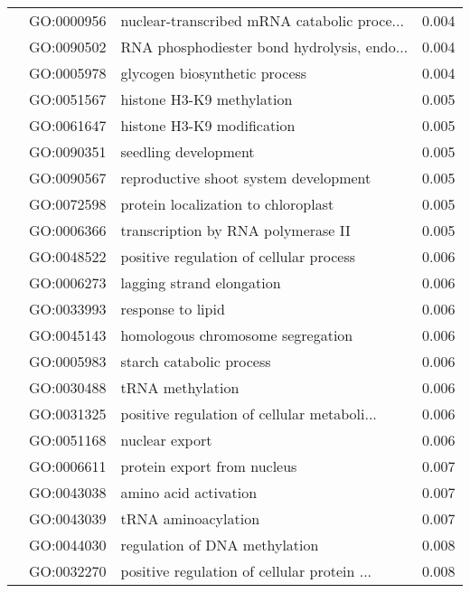 \begin{longtable}{lllr}
   & GO:0000956 &  nuclear-transcribed mRNA catabolic proce... &         0.004 \\
   & GO:0090502 &  RNA phosphodiester bond hydrolysis, endo... &         0.004 \\
   & GO:0005978 &                glycogen biosynthetic process &         0.004 \\
   & GO:0051567 &                    histone H3-K9 methylation &         0.005 \\
   & GO:0061647 &                   histone H3-K9 modification &         0.005 \\
   & GO:0090351 &                         seedling development &         0.005 \\
   & GO:0090567 &        reproductive shoot system development &         0.005 \\
   & GO:0072598 &          protein localization to chloroplast &         0.005 \\
   & GO:0006366 &           transcription by RNA polymerase II &         0.005 \\
   & GO:0048522 &      positive regulation of cellular process &         0.006 \\
   & GO:0006273 &                    lagging strand elongation &         0.006 \\
   & GO:0033993 &                            response to lipid &         0.006 \\
   & GO:0045143 &            homologous chromosome segregation &         0.006 \\
   & GO:0005983 &                     starch catabolic process &         0.006 \\
   & GO:0030488 &                             tRNA methylation &         0.006 \\
   & GO:0031325 &  positive regulation of cellular metaboli... &         0.006 \\
   & GO:0051168 &                               nuclear export &         0.006 \\
   & GO:0006611 &                  protein export from nucleus &         0.007 \\
   & GO:0043038 &                        amino acid activation &         0.007 \\
   & GO:0043039 &                          tRNA aminoacylation &         0.007 \\
   & GO:0044030 &                regulation of DNA methylation &         0.008 \\
   & GO:0032270 &  positive regulation of cellular protein ... &         0.008 \\

\end{longtable}

